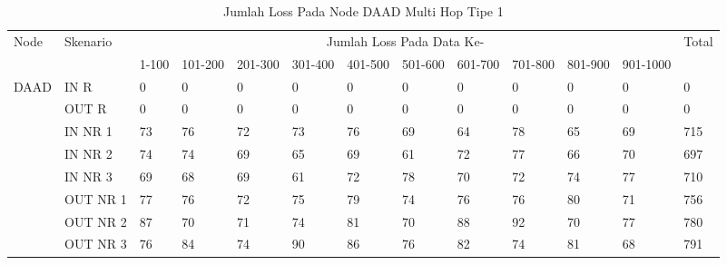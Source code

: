 \begin{table}[H]
  \centering
  \caption{Jumlah Loss Pada Node DAAD Multi Hop Tipe 1}
    \begin{tabular}{|p{1cm}|p{1.9cm}|p{0.6cm}|p{0.6cm}|p{0.6cm}|p{0.6cm}|p{0.6cm}|p{0.6cm}|p{0.6cm}|p{0.6cm}|p{0.6cm}|p{0.6cm}|p{1cm}|}
    \hline
        \multirow{2}{*}{Node}&\multirow{2}{*}{Skenario}&\multicolumn{10}{|c|}{Jumlah Loss Pada Data Ke-}&\multirow{2}{*}{Total} \\\cline{3-12}
          & & 1-100 & 101-200 & 201-300 & 301-400 & 401-500 & 501-600 & 601-700 & 701-800 & 801-900 & 901-1000 & \\
        \hline
    \multirow{8}{*}{DAAD}  
    & IN R  & 0     & 0     & 0     & 0     & 0     & 0     & 0     & 0     & 0     & 0     & 0 \\
          & OUT R & 0     & 0     & 0     & 0     & 0     & 0     & 0     & 0     & 0     & 0     & 0 \\
          & IN NR 1 & 73    & 76    & 72    & 73    & 76    & 69    & 64    & 78    & 65    & 69    & 715 \\
          & IN NR 2 & 74    & 74    & 69    & 65    & 69    & 61    & 72    & 77    & 66    & 70    & 697 \\
          & IN NR 3 & 69    & 68    & 69    & 61    & 72    & 78    & 70    & 72    & 74    & 77    & 710 \\
          & OUT NR 1 & 77    & 76    & 72    & 75    & 79    & 74    & 76    & 76    & 80    & 71    & 756 \\
          & OUT NR 2 & 87    & 70    & 71    & 74    & 81    & 70    & 88    & 92    & 70    & 77    & 780 \\
          & OUT NR 3 & 76    & 84    & 74    & 90    & 86    & 76    & 82    & 74    & 81    & 68    & 791 \\
    \hline
    \end{tabular}%
  \label{tab:addlabel}%
\end{table}%
